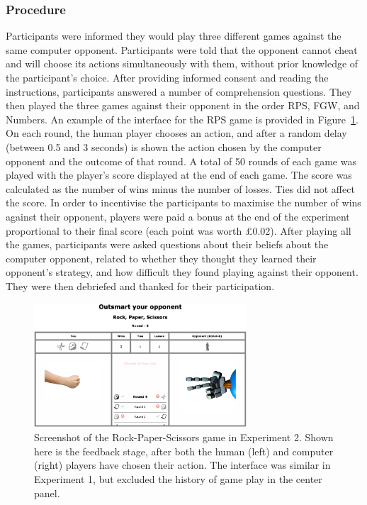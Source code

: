 \documentclass[
  english,
  man,floatsintext]{apa6}
\begin{document}
\hypertarget{procedure}{%
\subsubsection{Procedure}\label{procedure}}

Participants were informed they would play three different games against the same computer opponent. Participants were told that the opponent cannot cheat and will choose its actions simultaneously with them, without prior knowledge of the participant's choice. After providing informed consent and reading the instructions, participants answered a number of comprehension questions. They then played the three games against their opponent in the order RPS, FGW, and Numbers. An example of the interface for the RPS game is provided in Figure~\ref{fig:feedback-rps-exp2}. On each round, the human player chooses an action, and after a random delay (between 0.5 and 3 seconds) is shown the action chosen by the computer opponent and the outcome of that round. A total of 50 rounds of each game was played with the player's score displayed at the end of each game. The score was calculated as the number of wins minus the number of losses. Ties did not affect the score. In order to incentivise the participants to maximise the number of wins against their opponent, players were paid a bonus at the end of the experiment proportional to their final score (each point was worth £0.02). After playing all the games, participants were asked questions about their beliefs about the computer opponent, related to whether they thought they learned their opponent's strategy, and how difficult they found playing against their opponent. They were then debriefed and thanked for their participation.

\begin{figure}

{\centering \includegraphics[width=3.13in]{images/feedback_rps} 

}

\caption{Screenshot of the Rock-Paper-Scissors game in Experiment 2. Shown here is the feedback stage, after both the human (left) and computer (right) players have chosen their action. The interface was similar in Experiment 1, but excluded the history of game play in the center panel.}\label{fig:feedback-rps-exp2}
\end{figure}
\end{document}
